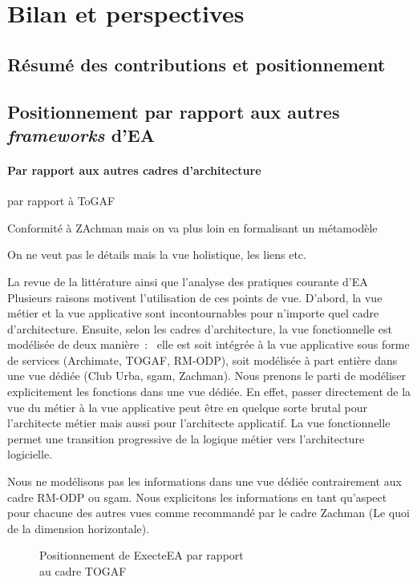\chapter{Bilan et perspectives}
\label{ch:bilan}

\PartialToc

\section{Résumé des contributions et positionnement}


\section{Positionnement par rapport aux autres \emph{frameworks} d'EA}

\subsubsection{Par rapport aux autres cadres d'architecture}
par rapport à ToGAF

Conformité à ZAchman mais on va plus loin en formalisant un métamodèle

On ne veut pas le détails mais la vue holistique, les liens etc.

La revue de la littérature ainsi que
l'analyse des pratiques courante d'EA Plusieurs raisons
motivent l'utilisation de ces points de vue. D'abord, la vue métier et la vue
applicative sont incontournables pour n'importe quel cadre d'architecture.
Ensuite, selon les cadres d'architecture, la vue fonctionnelle est modélisée de
deux manière~:~ elle est soit intégrée à la vue applicative sous forme de
services (Archimate, TOGAF, RM-ODP), soit modélisée à part entière dans une vue
dédiée (Club Urba, \gls{sgam}, Zachman). Nous prenons le parti de modéliser
explicitement les fonctions dans une vue dédiée. En effet, passer directement
de la vue du métier à la vue applicative peut être en quelque sorte brutal pour
l'architecte métier mais aussi pour l'architecte applicatif. La vue fonctionnelle
permet une transition progressive de la logique métier vers l'architecture
logicielle.

Nous ne modélisons pas les informations dans une vue dédiée contrairement aux
cadre RM-ODP ou \gls{sgam}. Nous explicitons les informations en tant qu'aspect
pour chacune des autres vues comme recommandé par le cadre Zachman (Le quoi de
la dimension horizontale).


\begin{figure}[!ht]
	
	\caption{Positionnement de ExecteEA par rapport\\ au cadre TOGAF}
	\label{fig:positionTogaf}
\end{figure}

